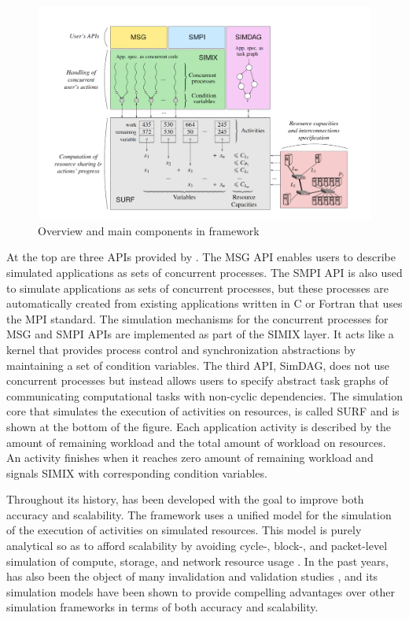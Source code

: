 \begin{figure}[!h]
     \centering
     \includegraphics[width=\linewidth]{figures/simgrid.png}
     \caption{Overview and main components in \simgrid framework}
     \label{fig:simgrid}
\end{figure}

At the top are three APIs provided by \simgrid. 
The MSG API enables users to describe simulated applications as sets of 
concurrent processes. 
The SMPI API is also used to simulate applications as sets of 
concurrent processes, but these processes are automatically created from 
existing applications written in C or Fortran that uses the MPI standard.
The simulation mechanisms for the concurrent processes for MSG and SMPI APIs
are implemented as part of the SIMIX layer. It acts like a kernel that provides 
process control and synchronization abstractions by maintaining a set of 
condition variables.
The third API, SimDAG, does not use concurrent processes but instead 
allows users to specify abstract task graphs of communicating computational 
tasks with non-cyclic dependencies.
The simulation core that simulates the execution of activities on resources, 
is called SURF and is shown at the bottom of the figure.
Each application activity is described by the amount of remaining workload 
and the total amount of workload on resources.
An activity finishes when it reaches zero amount of remaining workload and 
signals SIMIX with corresponding condition variables. 
 
Throughout its history, \simgrid has been developed with the goal 
to improve both accuracy and scalability. 
The framework uses a unified model for the simulation of the execution 
of activities on simulated resources.
This model is purely analytical so as to afford scalability by avoiding cycle-, 
block-, and packet-level simulation of compute, storage, and network 
resource usage \cite{casanova2014simgrid}.
In the past years, \simgrid has also been the object of many invalidation and 
validation studies \cite{bedaride2013toward,velho2013validity,
velho2009accuracy,lebre2015}, and its simulation models 
have been shown to provide compelling advantages over other simulation 
frameworks in terms of both accuracy and scalability.

